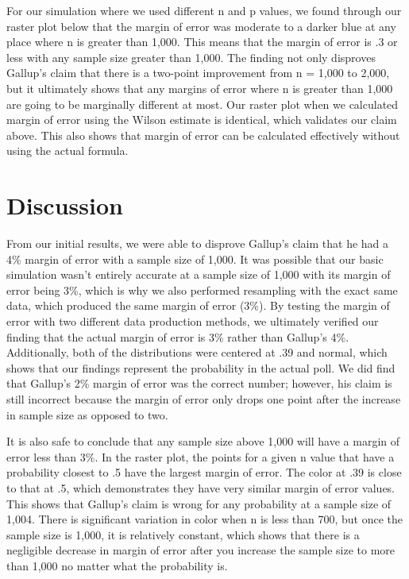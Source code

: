 \documentclass{article}\usepackage[]{graphicx}\usepackage[]{xcolor}
\begin{document}
\begin{multicols}{2}
For our simulation where we used different n and p values, we found through our raster plot below that the margin of error was moderate to a darker blue at any place where n is greater than 1,000. This means that the margin of error is .3 or less with any sample size greater than 1,000. The finding not only disproves Gallup's claim that there is a two-point improvement from n = 1,000 to 2,000, but it ultimately shows that any margins of error where n is greater than 1,000 are going to be marginally different at most. Our raster plot when we calculated margin of error using the Wilson estimate is identical, which validates our claim above. This also shows that margin of error can be calculated effectively without using the actual formula. 

\section{Discussion}
From our initial results, we were able to disprove Gallup's claim that he had a 4\% margin of error with a sample size of 1,000. It was possible that our basic simulation wasn't entirely accurate at a sample size of 1,000 with its margin of error being 3\%, which is why we also performed resampling with the exact same data, which produced the same margin of error (3\%). By testing the margin of error with two different data production methods, we ultimately verified our finding that the actual margin of error is 3\% rather than Gallup's 4\%. Additionally, both of the distributions were centered at .39 and normal, which shows that our findings represent the probability in the actual poll. We did find that Gallup's 2\% margin of error was the correct number; however, his claim is still incorrect because the margin of error only drops one point after the increase in sample size as opposed to two. 

It is also safe to conclude that any sample size above 1,000 will have a margin of error less than 3\%. In the raster plot, the points for a given n value that have a probability closest to .5 have the largest margin of error. The color at .39 is close to that at .5, which demonstrates they have very similar margin of error values. This shows that Gallup's claim is wrong for any probability at a sample size of 1,004. There is significant variation in color when n is less than 700, but once the sample size is 1,000, it is relatively constant, which shows that there is a negligible decrease in margin of error after you increase the sample size to more than 1,000 no matter what the probability is. 

\vspace{2em}
\begin{tiny}

\end{tiny}
\end{multicols}
\end{document}
